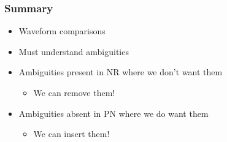 \documentclass[12pt,xcolor={dvipsnames}]{beamer}
\renewcommand{\vec}{\bm}
\renewcommand{\vec}[1]{\boldsymbol{#1}}
\begin{document}


\begin{frame}
  \frametitle{Summary}
  \begin{itemize}
  \item Waveform comparisons
  \item Must understand ambiguities
  \item Ambiguities present in NR where we don't want them
    \begin{itemize}
    \item We can remove them!
    \end{itemize}
  \item Ambiguities absent in PN where we do want them
    \begin{itemize}
    \item We can insert them!
    \end{itemize}
  \end{itemize}
\end{frame}
\end{document}
